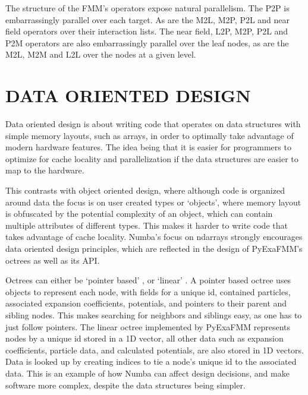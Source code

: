 \documentclass{IEEEcsmag}
\begin{document}
The structure of the FMM's operators expose natural parallelism. The P2P is embarrassingly parallel over each target. As are the M2L, M2P, P2L and near field operators over their interaction lists. The near field, L2P, M2P, P2L and P2M operators are also embarrassingly parallel over the leaf nodes, as are the M2L, M2M and L2L over the nodes at a given level.

\section{DATA ORIENTED DESIGN}

Data oriented design is about writing code that operates on data structures with simple memory layouts, such as arrays, in order to optimally take advantage of modern hardware features. The idea being that it is easier for programmers to optimize for cache locality and parallelization if the data structures are easier to map to the hardware.

This contrasts with object oriented design, where although code is organized around data the focus is on user created types or `objects', where memory layout is obfuscated by the potential complexity of an object, which can contain multiple attributes of different types. This makes it harder to write code that takes advantage of cache locality. Numba's focus on ndarrays strongly encourages data oriented design principles, which are reflected in the design of PyExaFMM's octrees as well as its API.

Octrees can either be `pointer based' \cite{Wang2021}, or `linear' \cite{Sundar2007}. A pointer based octree uses objects to represent each node, with fields for a unique id, contained particles, associated expansion coefficients, potentials, and pointers to their parent and sibling nodes. This makes searching for neighbors and siblings easy, as one has to just follow pointers. The linear octree implemented by PyExaFMM represents nodes by a unique id stored in a 1D vector, all other data such as expansion coefficients, particle data, and calculated potentials, are also stored in 1D vectors. Data is looked up by creating indices to tie a node's unique id to the associated data. This is an example of how Numba can affect design decisions, and make software more complex, despite the data structures being simpler.
\end{document}
